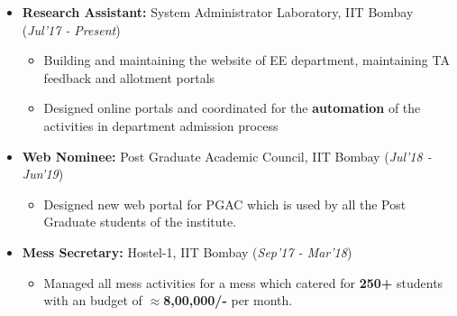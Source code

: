 \documentclass[10pt]{article}
\begin{document}
\colorbox{bl}{}

\begin{itemize}[leftmargin=0.4cm]
\vspace{-0.2cm}

\item \textbf {Research Assistant:} System Administrator Laboratory, IIT Bombay \hfill{(\textit{Jul'17 - Present})}\\[-0.7cm]
        \begin{itemize}
    \item Building and maintaining the website of EE department, maintaining TA feedback and allotment portals\vspace{-0.1cm}
    \item Designed online portals and coordinated for the \textbf{automation} of the activities in department admission process
    \end{itemize}
    \vspace{-0.3cm}


\item \textbf{Web Nominee:} Post Graduate Academic Council, IIT Bombay \hfill{(\textit{Jul'18 - Jun'19})}\\[-0.65cm]
\begin{itemize}
\item Designed new web portal for PGAC which is used by all the Post Graduate students of the institute. \vspace{-0.25cm}

\end{itemize}

\item \textbf{Mess Secretary:
 }  Hostel-1, IIT Bombay   \hfill{(\textit{Sep'17 - Mar'18})}\\[-0.65cm]
 \begin{itemize}
\item Managed all mess activities for a mess which catered for \textbf{250+} students with an budget of \textbf{$\approx$8,00,000/-} per month.\vspace{-0.25cm}

\end{itemize}

\vspace{-0.05cm}
\end{itemize}
\end{document}
